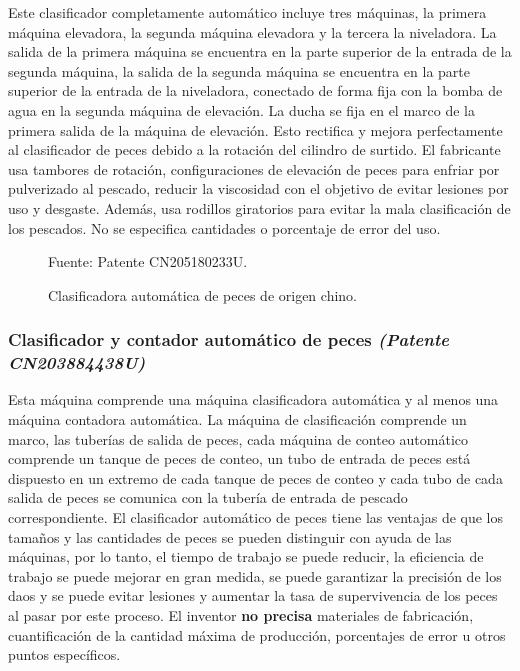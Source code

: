 Este clasificador completamente automático incluye tres máquinas, la primera máquina elevadora, la segunda máquina elevadora y la tercera la niveladora. La salida de la primera máquina se encuentra en la parte superior de la entrada de la segunda máquina, la salida de la segunda máquina se encuentra en la parte superior de la entrada de la niveladora, conectado de forma fija con la bomba de agua en la segunda máquina de elevación. La ducha se fija en el marco de la primera salida de la máquina de elevación. Esto rectifica y mejora perfectamente al clasificador de peces debido a la rotación del cilindro de surtido.\citep{Fang2015} El fabricante usa tambores de rotación, configuraciones de elevación de peces para enfriar por pulverizado al pescado, reducir la viscosidad con el objetivo de evitar lesiones por uso y desgaste. Además, usa rodillos giratorios para evitar la mala clasificación de los pescados. No se especifica cantidades o porcentaje de error del uso.

\begin{figure}[H]
	\centering
	\caption{Clasificadora automática de peces de origen chino.}
	\begin{myflushleftportland}
		Fuente: Patente CN205180233U.
	\end{myflushleftportland}
	\label{fig:clasificadora automatica de peces de origen chino}
\end{figure}

\subsubsection{Clasificador y contador automático de peces \textit{(Patente CN203884438U)}}

Esta máquina comprende una máquina clasificadora automática y al menos una máquina contadora automática. La máquina de clasificación comprende un marco, las tuberías de salida de peces, cada máquina de conteo automático comprende un tanque de peces de conteo, un tubo de entrada de peces está dispuesto en un extremo de cada tanque de peces de conteo y cada tubo de cada salida de peces se comunica con la tubería de entrada de pescado correspondiente. El clasificador automático de peces tiene las ventajas de que los tamaños y las cantidades de peces se pueden distinguir con ayuda de las máquinas, por lo tanto, el tiempo de trabajo se puede reducir, la eficiencia de trabajo se puede mejorar en gran medida, se puede garantizar la precisión de los daos y se puede evitar lesiones y aumentar la tasa de supervivencia de los peces al pasar por este proceso.\citep{Jingwen2014} El inventor \textbf{no precisa} materiales de fabricación, cuantificación de la cantidad máxima de producción, porcentajes de error u otros puntos específicos.

